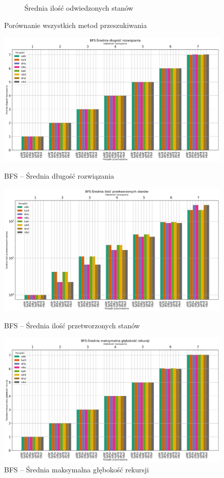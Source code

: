\documentclass{classrep}
\begin{document}
\begin{figure}[H]
\begin{subfigure}[t]{0.45\textwidth}
        \caption{Średnia ilość odwiedzonych stanów}
        \label{ASTR:visited}
    \end{subfigure}
    \caption{Porównanie wszystkich metod przeszukiwania}\label{coll:astr}
\end{figure}

\begin{figure}[H]
    \includegraphics[width=\textwidth]{charts/BFS_path_length.png}
    \caption{BFS -- Średnia długość rozwiązania}
    \label{BFS:path_length}
    \vspace{0.2cm}
    \includegraphics[width=\textwidth]{charts/BFS_processed.png}
    \caption{BFS -- Średnia ilość przetworzonych stanów}
    \label{BFS:processed}
    \vspace{0.2cm}
    \includegraphics[width=\textwidth]{charts/BFS_recursed.png}
    \caption{BFS --  Średnia maksymalna głębokość rekursji}
    \label{BFS:time}

\end{figure}
\end{document}
